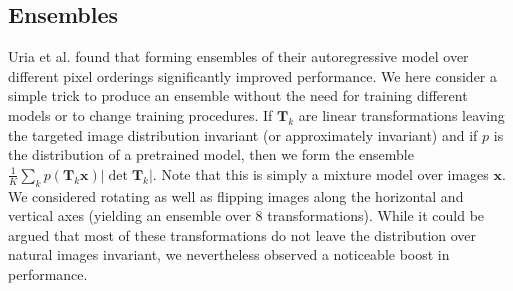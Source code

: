 \documentclass{article}
\begin{document}
		\subsection{Ensembles}
		Uria et al. \cite{Uria:2014} found that forming ensembles of their autoregressive model over
		different pixel orderings significantly improved performance. We here consider a simple trick to
		produce an ensemble without the need for training different models or to change training
		procedures. If $\mathbf{T}_k$ are linear transformations leaving the targeted image distribution
		invariant (or approximately invariant) and if $p$ is the distribution of a pretrained model, then we form the ensemble
		$\frac{1}{K} \sum_k p(\mathbf{T}_k \mathbf{x}) |\det \mathbf{T}_k|$. Note that this is simply a mixture
		model over images $\mathbf{x}$. We considered rotating as well as flipping images along the horizontal and
		vertical axes (yielding an ensemble over 8 transformations). While it could be argued that most
		of these transformations do not leave the distribution over natural images invariant, we
		nevertheless observed a noticeable boost in performance.
\end{document}
